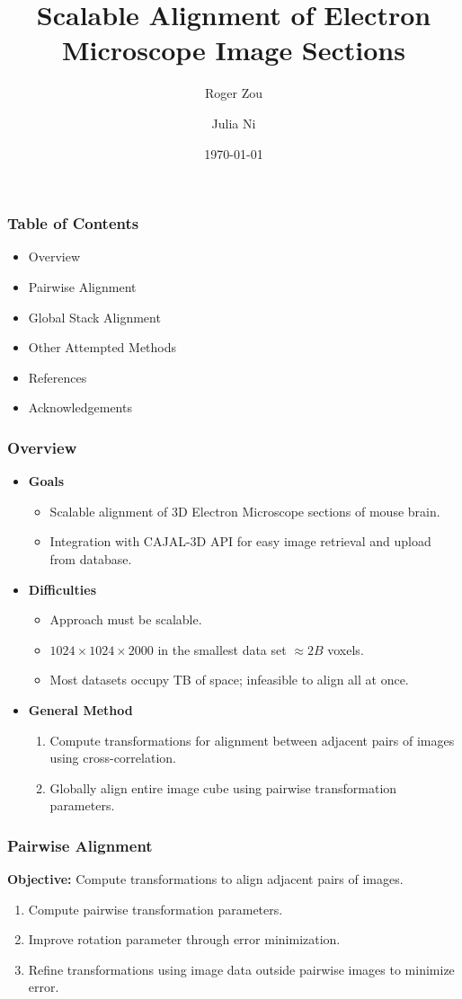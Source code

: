 \documentclass{beamer}
\begin{document}
\title[Scalable EM Alignment]
{Scalable Alignment of Electron Microscope Image Sections}
\author[Zou, Ni] {Roger Zou \and Julia Ni}
\date{\today}

\frame{\titlepage}

\begin{frame}
\frametitle{Table of Contents}
\begin{itemize}
\item Overview
\item Pairwise Alignment
\item Global Stack Alignment
\item Other Attempted Methods
\item References
\item Acknowledgements 
\end{itemize}
\end{frame}

\begin{frame}
\frametitle{Overview}
\begin{itemize}
\item \textbf{Goals}
\begin{itemize}
\item Scalable alignment of 3D Electron Microscope sections of mouse brain.
\item Integration with CAJAL-3D API for easy image retrieval and upload from database.
\end{itemize}
\item \textbf{Difficulties} 
\begin{itemize}
\item Approach must be scalable.
\item $1024 \times 1024 \times 2000$ in the smallest data set $\approx 2B$ voxels.
\item Most datasets occupy TB of space; infeasible to align all at once.
\end{itemize}
\item \textbf{General Method}
\begin{enumerate}
\item Compute transformations for alignment between adjacent pairs of images using cross-correlation.
\item Globally align entire image cube using pairwise transformation parameters.
\end{enumerate}
\end{itemize}
\end{frame}

\begin{frame}
\frametitle{Pairwise Alignment}
\textbf{Objective:} Compute transformations to align adjacent pairs of images. \\
\begin{enumerate}
\item Compute pairwise transformation parameters.
\item Improve rotation parameter through error minimization.
\item Refine transformations using image data outside pairwise images to minimize error.
\end{enumerate}
\end{frame}
\end{document}
